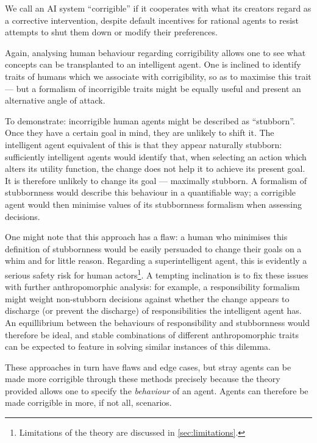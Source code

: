 \begin{displayquote}
We call an AI system ``corrigible'' if it cooperates with what its creators regard as a corrective intervention, despite default incentives for rational agents to resist attempts to shut them down or modify their preferences.
\end{displayquote}

Again, analysing human behaviour regarding corrigibility allows one to see what concepts can be transplanted to an intelligent agent. One is inclined to identify traits of humans which we associate with corrigibility, so as to maximise this trait --- but a formalism of incorrigible traits might be equally useful and present an alternative angle of attack.\par

To demonstrate: incorrigible human agents might be described as ``stubborn''. Once they have a certain goal in mind, they are unlikely to shift it. The intelligent agent equivalent of this is that they appear naturally stubborn: sufficiently intelligent agents would identify that, when selecting an action which alters its utility function, the change does not help it to achieve its present goal. It is therefore unlikely to change its goal --- maximally stubborn. A formalism of stubbornness would describe this behaviour in a quantifiable way; a corrigible agent would then minimise values of its stubbornness formalism when assessing decisions.\par

One might note that this approach has a flaw: a human who minimises this definition of stubbornness would be easily persuaded to change their goals on a whim and for little reason. Regarding a superintelligent agent, this is evidently a serious safety risk for human actors\footnote{Limitations of the theory are discussed in \cref{sec:limitations}.}. A tempting inclination is to fix these issues with further anthropomorphic analysis: for example, a responsibility formalism might weight non-stubborn decisions against whether the change appears to discharge (or prevent the discharge) of responsibilities the intelligent agent has. An equillibrium between the behaviours of responsibility and stubbornness would therefore be ideal, and stable combinations of different anthropomorphic traits can be expected to feature in solving similar instances of this dilemma.\par

These approaches in turn have flaws and edge cases, but stray agents can be made more corrigible through these methods precisely because the theory provided allows one to specify the \emph{behaviour} of an agent. Agents can therefore be made corrigible in more, if not all, scenarios.\par

